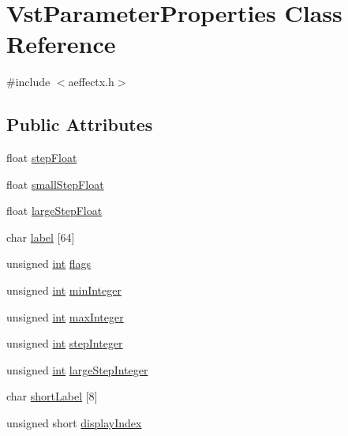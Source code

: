 \hypertarget{class_vst_parameter_properties}{}\section{Vst\+Parameter\+Properties Class Reference}
\label{class_vst_parameter_properties}


{\ttfamily \#include $<$aeffectx.\+h$>$}

\subsection*{Public Attributes}
\begin{DoxyCompactItemize}
\item 
float \hyperlink{class_vst_parameter_properties_af6499b61dddc045cf2a130c269b0f801}{step\+Float}
\item 
float \hyperlink{class_vst_parameter_properties_a824b5575217eada365d3b4e574ee6ff8}{small\+Step\+Float}
\item 
float \hyperlink{class_vst_parameter_properties_ac15a8208d47984575535639ee66afd6e}{large\+Step\+Float}
\item 
char \hyperlink{class_vst_parameter_properties_a3b0ff07ceb59630d174218b8a0f04ab9}{label} \mbox{[}64\mbox{]}
\item 
unsigned \hyperlink{xmltok_8h_a5a0d4a5641ce434f1d23533f2b2e6653}{int} \hyperlink{class_vst_parameter_properties_a725356e340e6003a3d0d4c334661d946}{flags}
\item 
unsigned \hyperlink{xmltok_8h_a5a0d4a5641ce434f1d23533f2b2e6653}{int} \hyperlink{class_vst_parameter_properties_a575e26f6313f8d4f8eff16b442c3b2bc}{min\+Integer}
\item 
unsigned \hyperlink{xmltok_8h_a5a0d4a5641ce434f1d23533f2b2e6653}{int} \hyperlink{class_vst_parameter_properties_a03b8193288ab7dc479fc04cad65be121}{max\+Integer}
\item 
unsigned \hyperlink{xmltok_8h_a5a0d4a5641ce434f1d23533f2b2e6653}{int} \hyperlink{class_vst_parameter_properties_abccf9c793f41f9ecbabe629048740d37}{step\+Integer}
\item 
unsigned \hyperlink{xmltok_8h_a5a0d4a5641ce434f1d23533f2b2e6653}{int} \hyperlink{class_vst_parameter_properties_a6c2bbd7e292beee2c63ce2b6fb9d51f5}{large\+Step\+Integer}
\item 
char \hyperlink{class_vst_parameter_properties_ae956cd75967859f11570b1d5e224b4ee}{short\+Label} \mbox{[}8\mbox{]}
\item 
unsigned short \hyperlink{class_vst_parameter_properties_a02fc8be0fb121711eff2253f603bf088}{display\+Index}

\end{DoxyCompactItemize}
